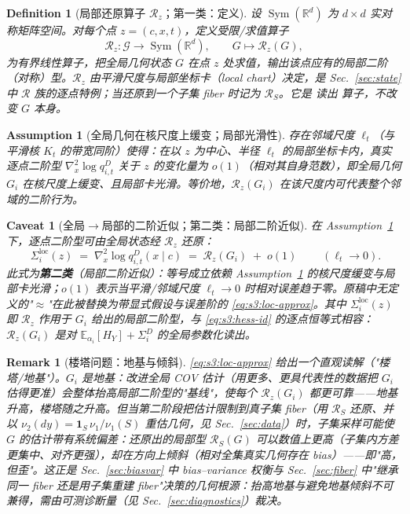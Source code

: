 \documentclass[11pt,a4paper]{article}
\newtheorem{definition}[theorem]{Definition}
\newtheorem{remark}[theorem]{Remark}
\newtheorem{caveat}[theorem]{Caveat}
\newtheorem{assumption}[theorem]{Assumption}
\newcommand{\E}{\mathbb{E}}
\newcommand{\R}{\mathbb{R}}
\newcommand{\cG}{\mathcal{G}}   %
\newcommand{\Rstr}{\mathcal{R}}     %
\newcommand{\Sym}{\operatorname{Sym}}
\begin{document}
\begin{definition}[局部还原算子 $\Rstr_z$；第一类：定义]\label{def:s3:Rz}
设 $\Sym(\R^d)$ 为 $d\times d$ 实对称矩阵空间。对每个点 $z=(c,x,t)$，定义\emph{受限/求值算子}
\begin{equation}\label{eq:s3:Rz}
\Rstr_z:\cG\longrightarrow \Sym(\R^d),\qquad G\longmapsto \Rstr_z(G),
\end{equation}
为有界线性算子，把全局几何状态 $G$ 在点 $z$ 处求值，输出该点应有的局部二阶（对称）型。$\Rstr_z$ 由平滑尺度与局部坐标卡（local chart）决定，是 Sec.~\ref{sec:state} 中 $\Rstr$ 族的逐点特例；当还原到一个子集 fiber 时记为 $\Rstr_S$。它是 \emph{读出} 算子，不改变 $G$ 本身。
\end{definition}

\begin{assumption}[全局几何在核尺度上缓变；局部光滑性]\label{ass:s3:slow}
存在邻域尺度 $\ell_t$（与平滑核 $K_t$ 的带宽同阶）使得：在以 $z$ 为中心、半径 $\ell_t$ 的局部坐标卡内，真实逐点二阶型 $\nabla_x^2\log q_{i,t}^{D}$ 关于 $z$ 的变化量为 $o(1)$（相对其自身范数），即全局几何 $G_i$ 在核尺度上缓变、且局部卡光滑。等价地，$\Rstr_z(G_i)$ 在该尺度内可代表整个邻域的二阶行为。
\end{assumption}

\begin{caveat}[全局$\to$局部的二阶近似；第二类：局部二阶近似]\label{cav:s3:loc}
在 Assumption~\ref{ass:s3:slow} 下，逐点二阶型可由全局状态经 $\Rstr_z$ 还原：
\begin{equation}\label{eq:s3:loc-approx}
\boxed{\;\Sigma_i^{\mathrm{loc}}(z)\;=\;\nabla_x^2\log q_{i,t}^{D}(x\mid c)\;=\;\Rstr_z(G_i)\;+\;o(1)\;}
\qquad(\ell_t\to 0).
\end{equation}
此式为\textbf{第二类}（局部二阶近似）：等号成立依赖 Assumption~\ref{ass:s3:slow} 的核尺度缓变与局部卡光滑；$o(1)$ 表示当平滑/邻域尺度 $\ell_t\to 0$ 时相对误差趋于零。原稿中无定义的"$\approx$"在此被替换为带显式假设与误差阶的 \eqref{eq:s3:loc-approx}。其中 $\Sigma_i^{\mathrm{loc}}(z)$ 即 $\Rstr_z$ 作用于 $G_i$ 给出的局部二阶型，与 \eqref{eq:s3:hess-id} 的逐点恒等式相容：$\Rstr_z(G_i)$ 是对 $\E_{\alpha_i}[H_Y]+\Sigma_i^{D}$ 的全局参数化读出。
\end{caveat}

\begin{remark}[楼塔问题：地基与倾斜]\label{rem:s3:tower}
\eqref{eq:s3:loc-approx} 给出一个直观读解（"楼塔/地基"）。$G_i$ 是地基：改进全局 COV 估计（用更多、更具代表性的数据把 $G_i$ 估得更准）会整体抬高局部二阶型的"基线"，使每个 $\Rstr_z(G_i)$ 都更可靠——地基升高，楼塔随之升高。但当第二阶段把估计限制到真子集 fiber（用 $\Rstr_S$ 还原、并以 $\nu_2(dy)=\mathbf 1_S\,\nu_1/\nu_1(S)$ 重估几何，见 Sec.~\ref{sec:data}）时，子集采样可能使 $G$ 的估计带有系统偏差：还原出的局部型 $\Rstr_S(G)$ 可以\emph{数值上更高}（子集内方差更集中、对齐更强），却在方向上\emph{倾斜}（相对全集真实几何存在 bias）——即"高，但歪"。这正是 Sec.~\ref{sec:biasvar} 中 bias--variance 权衡与 Sec.~\ref{sec:fiber} 中"继承同一 fiber 还是用子集重建 fiber"决策的几何根源：抬高地基与避免地基倾斜不可兼得，需由可测诊断量（见 Sec.~\ref{sec:diagnostics}）裁决。
\end{remark}
\end{document}

